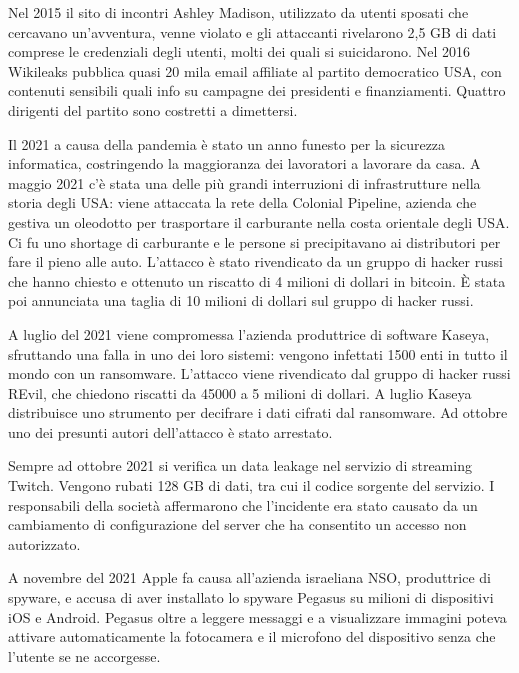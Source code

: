 Nel 2015 il sito di incontri Ashley Madison, utilizzato da utenti sposati che cercavano un'avventura, venne violato e gli attaccanti rivelarono 2,5 GB di dati comprese le credenziali degli utenti, molti dei quali si suicidarono. Nel 2016 Wikileaks pubblica quasi 20 mila email affiliate al partito democratico USA, con contenuti sensibili quali info su campagne dei presidenti e finanziamenti. Quattro dirigenti del partito sono costretti a dimettersi.

\vspace{4mm}

Il 2021 a causa della pandemia è stato un anno funesto per la sicurezza informatica, costringendo la maggioranza dei lavoratori a lavorare da casa. A maggio 2021 c'è stata una delle più grandi interruzioni di infrastrutture nella storia degli USA: viene attaccata la rete della Colonial Pipeline, azienda che gestiva un oleodotto per trasportare il carburante nella costa orientale degli USA. Ci fu uno shortage di carburante e le persone si precipitavano ai distributori per fare il pieno alle auto. L'attacco è stato rivendicato da un gruppo di hacker russi che hanno chiesto e ottenuto un riscatto di 4 milioni di dollari in bitcoin. È stata poi annunciata una taglia di 10 milioni di dollari sul gruppo di hacker russi.

A luglio del 2021 viene compromessa l'azienda produttrice di software Kaseya, sfruttando una falla in uno dei loro sistemi: vengono infettati 1500 enti in tutto il mondo con un ransomware. L'attacco viene rivendicato dal gruppo di hacker russi REvil, che chiedono riscatti da 45000 a 5 milioni di dollari. A luglio Kaseya distribuisce uno strumento per decifrare i dati cifrati dal ransomware. Ad ottobre uno dei presunti autori dell'attacco è stato arrestato.

Sempre ad ottobre 2021 si verifica un data leakage nel servizio di streaming Twitch. Vengono rubati 128 GB di dati, tra cui il codice sorgente del servizio. I responsabili della società affermarono che l'incidente era stato causato da un cambiamento di configurazione del server che ha consentito un accesso non autorizzato.

A novembre del 2021 Apple fa causa all'azienda israeliana NSO, produttrice di spyware, e accusa di aver installato lo spyware Pegasus su milioni di dispositivi iOS e Android. Pegasus oltre a leggere messaggi e a visualizzare immagini poteva attivare automaticamente la fotocamera e il microfono del dispositivo senza che l'utente se ne accorgesse.

